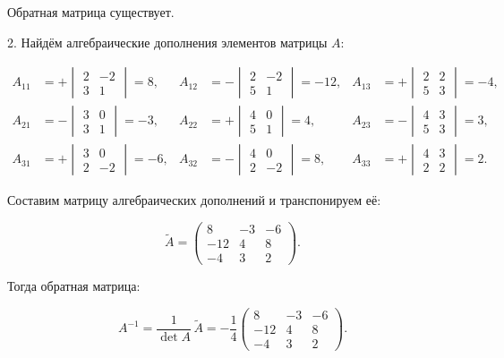 \documentclass[12pt]{article}
\begin{document}
Обратная матрица существует.

2. Найдём алгебраические дополнения элементов матрицы \( A \):

\[
\begin{aligned}
A_{11} &= +\begin{vmatrix} 2 & -2 \\ 3 & 1 \end{vmatrix} = 8, &
A_{12} &= -\begin{vmatrix} 2 & -2 \\ 5 & 1 \end{vmatrix} = -12, &
A_{13} &= +\begin{vmatrix} 2 & 2 \\ 5 & 3 \end{vmatrix} = -4, \\
A_{21} &= -\begin{vmatrix} 3 & 0 \\ 3 & 1 \end{vmatrix} = -3, &
A_{22} &= +\begin{vmatrix} 4 & 0 \\ 5 & 1 \end{vmatrix} = 4, &
A_{23} &= -\begin{vmatrix} 4 & 3 \\ 5 & 3 \end{vmatrix} = 3, \\
A_{31} &= +\begin{vmatrix} 3 & 0 \\ 2 & -2 \end{vmatrix} = -6, &
A_{32} &= -\begin{vmatrix} 4 & 0 \\ 2 & -2 \end{vmatrix} = 8, &
A_{33} &= +\begin{vmatrix} 4 & 3 \\ 2 & 2 \end{vmatrix} = 2.
\end{aligned}
\]

Составим матрицу алгебраических дополнений и транспонируем её:

\[
\widetilde{A} = 
\begin{pmatrix}
8 & -3 & -6 \\
-12 & 4 & 8 \\
-4 & 3 & 2
\end{pmatrix}.
\]

Тогда обратная матрица:

\[
A^{-1} = \frac{1}{\det A} \, \widetilde{A} = -\frac{1}{4}
\begin{pmatrix}
8 & -3 & -6 \\
-12 & 4 & 8 \\
-4 & 3 & 2
\end{pmatrix}.
\]
\end{document}
